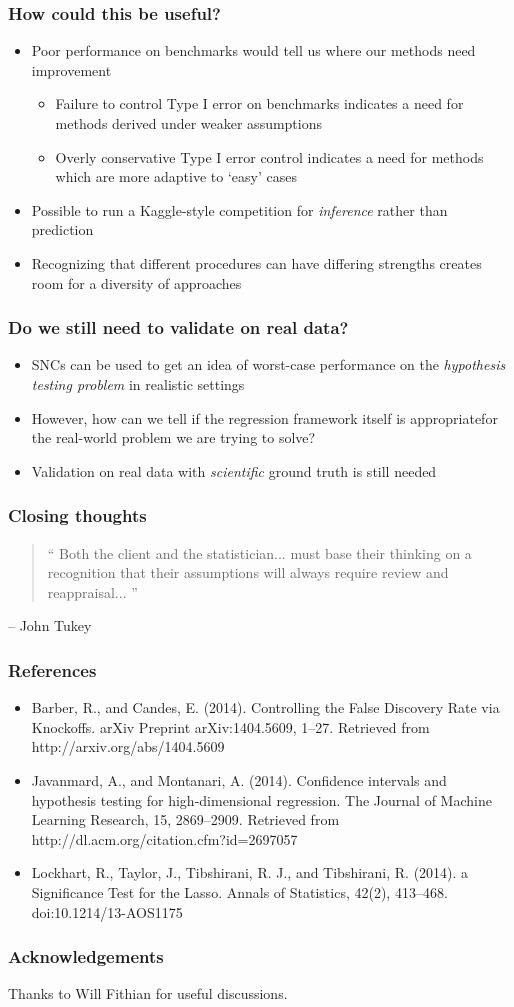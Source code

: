 \documentclass{beamer}
\begin{document}
\begin{frame}
\frametitle{How could this be useful?}
\begin{itemize}
\item Poor performance on benchmarks would tell us where our methods need improvement
\begin{itemize}
\item Failure to control Type I error on benchmarks indicates a need for methods derived under weaker assumptions
\item Overly conservative Type I error control indicates a need for methods which are more adaptive to `easy' cases
\end{itemize}
\item Possible to run a Kaggle-style competition for \emph{inference} rather than prediction
\item Recognizing that different procedures can have differing strengths creates room for a diversity of approaches
\end{itemize}
\end{frame}

\begin{frame}
\frametitle{Do we still need to validate on real data?}
\begin{itemize}
\item SNCs can be used to get an idea of worst-case performance on the \emph{hypothesis testing problem} in realistic settings
\item However, how can we tell if the regression framework itself is appropriatefor the real-world problem we are trying to solve?
\item Validation on real data with \emph{scientific} ground truth is still needed
\end{itemize}
\end{frame}

\begin{frame}
\frametitle{Closing thoughts}
\begin{quotation}
`` Both the client and the statistician... must base their thinking on
  a recognition that their assumptions will always require review and
  reappraisal...  ''
\end{quotation}
\hfill -- John Tukey
\end{frame}

\begin{frame}
\frametitle{References}
\begin{itemize}
\item Barber, R., and Candes, E. (2014). Controlling the False Discovery Rate via Knockoffs. arXiv Preprint arXiv:1404.5609, 1–27. Retrieved from http://arxiv.org/abs/1404.5609
\item Javanmard, A., and Montanari, A. (2014). Confidence intervals and hypothesis testing for high-dimensional regression. The Journal of Machine Learning Research, 15, 2869–2909. Retrieved from http://dl.acm.org/citation.cfm?id=2697057
\item Lockhart, R., Taylor, J., Tibshirani, R. J., and Tibshirani, R. (2014). a Significance Test for the Lasso. Annals of Statistics, 42(2), 413–468. doi:10.1214/13-AOS1175
\end{itemize}
\end{frame}


\begin{frame}
\frametitle{Acknowledgements}
Thanks to Will Fithian for useful discussions.
\end{frame}
\end{document}
